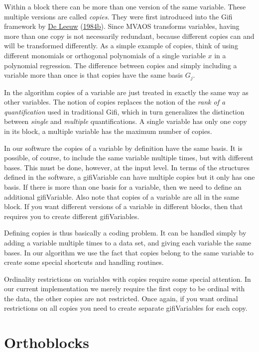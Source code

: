 \documentclass[
  12pt,
]{book}
\begin{document}
Within a block there can be more than one version of the same variable. These multiple versions are called \emph{copies}. They were first introduced into the Gifi framework by \protect\hyperlink{ref-deleeuw_C_84c}{De Leeuw} (\protect\hyperlink{ref-deleeuw_C_84c}{1984b}). Since MVAOS transforms variables, having more than one copy is not necessarily redundant, because different copies can and will be transformed differently. As a simple example of copies, think of using different monomials or orthogonal polynomials of a single variable \(x\) in a polynomial regression. The difference between copies and simply including a variable more than once is that copies have the same basis \(G_j\).

In the algorithm copies of a variable are just treated in exactly the same way as other variables. The notion of copies replaces the notion of the \emph{rank of a quantification} used in traditional Gifi, which in turn generalizes the distinction between \emph{single} and \emph{multiple} quantifications. A single variable has only one copy in its block, a multiple variable has the maximum number of copies.

In our software the copies of a variable by definition have the same basis. It is possible, of course, to include the same variable multiple times, but with different bases. This must be done, however, at the input level. In terms of the structures defined in the software, a gifiVariable can have multiple copies but it only has one basis. If there is more than one basis for a variable, then we need to define an additional gifiVariable. Also note that copies of a variable are all in the same block. If you want different versions of a variable in different blocks, then that requires you to create different gifiVariables.

Defining copies is thus basically a coding problem. It can be handled simply by adding a variable multiple times to a data set, and giving each variable the same bases. In our algorithm we use the fact that copies belong to the same variable to create some special shortcuts and handling routines.

Ordinality restrictions on variables with copies require some special attention. In our current implementation we merely require the first copy to be ordinal with the data, the other copies are not restricted. Once again, if you want ordinal restrictions on all copies you need to create separate gifiVariables for each copy.

\hypertarget{orthoblocks}{%
\section{Orthoblocks}\label{orthoblocks}}
\end{document}
